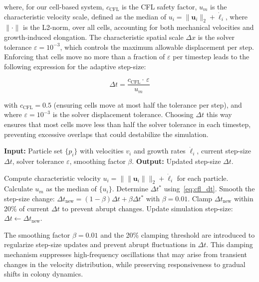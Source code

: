 \documentclass[a4paper,fleqn]{cas-dc}
\begin{document}
where, for our cell-based system, $c_{\mathrm{CFL}}$ is the CFL safety factor, $u_m$ is the characteristic velocity scale, defined as the median of $u_i = \|\textbf{u}_i\|_2 + \dot{\ell}_i$, where $\| \cdot \|$ is the L2-norm, over all cells, accounting for both mechanical velocities and growth-induced elongation. The characteristic spatial scale $\Delta x$ is the solver tolerance $\varepsilon = 10^{-3}$, which controls the maximum allowable displacement per step. Enforcing that cells move no more than a fraction of $\varepsilon$ per timestep leads to the following expression for the adaptive step-size:

\begin{equation} \label{eq:cfl_dt}
    \Delta t = \frac{c_{\mathrm{CFL}} \cdot\, \varepsilon}{u_m}
\end{equation}

with $c_{\mathrm{CFL}} = 0.5$ (ensuring cells move at most half the tolerance per step), and where $\varepsilon = 10^{-3}$ is the solver displacement tolerance. Choosing $\Delta t$ this way ensures that most cells move less than half the solver tolerance in each timestep, preventing excessive overlaps that could destabilize the simulation.

\begin{algorithm}[h]
    \caption{Adaptive Timestep Control}
    \label{alg:adaptive_dt}
    \begin{algorithmic}[1]
        \State \textbf{Input:} Particle set $\{p_i\}$ with velocities $v_i$ and growth rates $\dot{\ell}_i$, current step-size $\Delta t$, solver tolerance $\varepsilon$, smoothing factor $\beta$.
        \State \textbf{Output:} Updated step-size $\Delta t$.

        \State Compute characteristic velocity $u_i = \|\|\textbf{u}_i\|\|_2 + \dot{\ell}_i$ for each particle.
        \State Calculate $u_m$ as the median of $\{u_i\}$.
        \State Determine $\Delta t^*$ using~\autoref{eq:cfl_dt}.
        \State Smooth the step-size change: $\Delta t_{\text{new}} = (1 - \beta)\Delta t + \beta \Delta t^*$ with $\beta = 0.01$.
        \State Clamp $\Delta t_{\text{new}}$ within 20\% of current $\Delta t$ to prevent abrupt changes.
        \State Update simulation step-size: $\Delta t \gets \Delta t_{\text{new}}$.
    \end{algorithmic}
\end{algorithm}

The smoothing factor $\beta = 0.01$ and the 20\% clamping threshold are introduced to regularize step-size updates and prevent abrupt fluctuations in $\Delta t$. This damping mechanism suppresses high-frequency oscillations that may arise from transient changes in the velocity distribution, while preserving responsiveness to gradual shifts in colony dynamics.
\end{document}
